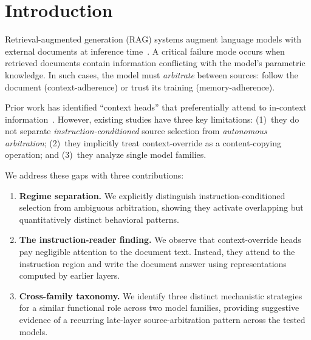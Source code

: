 \documentclass{article}
\begin{document}
\section{Introduction}
\label{sec:intro}

Retrieval-augmented generation (RAG) systems augment language models with external documents at inference time~\citep{liu2023lost}. A critical failure mode occurs when retrieved documents contain information conflicting with the model's parametric knowledge. In such cases, the model must \textit{arbitrate} between sources: follow the document (context-adherence) or trust its training (memory-adherence).

Prior work has identified ``context heads'' that preferentially attend to in-context information~\citep{shi2024context,wolfson2025taming,wu2024retrieval}. However, existing studies have three key limitations: (1)~they do not separate \emph{instruction-conditioned} source selection from \emph{autonomous arbitration}; (2)~they implicitly treat context-override as a content-copying operation; and (3)~they analyze single model families.

We address these gaps with three contributions:

\begin{enumerate}
    \item \textbf{Regime separation.} We explicitly distinguish instruction-conditioned selection from ambiguous arbitration, showing they activate overlapping but quantitatively distinct behavioral patterns.
    
    \item \textbf{The instruction-reader finding.} We observe that context-override heads pay negligible attention to the document text. Instead, they attend to the instruction region and write the document answer using representations computed by earlier layers.
    
    \item \textbf{Cross-family taxonomy.} We identify three distinct mechanistic strategies for a similar functional role across two model families, providing suggestive evidence of a recurring late-layer source-arbitration pattern across the tested models.
\end{enumerate}

\end{document}
